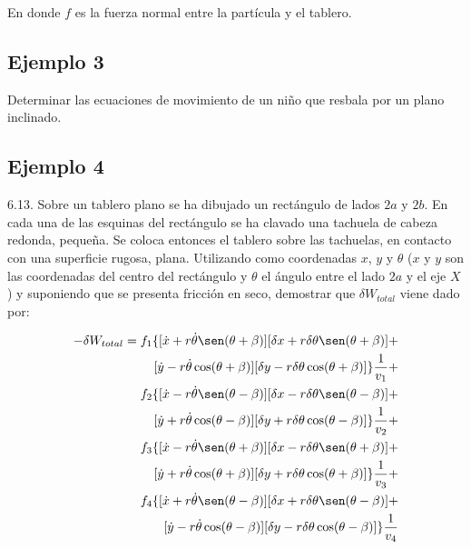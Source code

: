 En donde $f$ es la fuerza normal entre la partícula y el tablero.

\subsection{Ejemplo 3}
Determinar las ecuaciones de movimiento de un niño que resbala por un plano
inclinado.

\subsection{Ejemplo 4}
6.13. Sobre un tablero plano se ha dibujado un rectángulo de lados $2a$ y $2b$.
En cada una de las esquinas del rectángulo se ha clavado una tachuela de cabeza
redonda, pequeña. Se coloca entonces el tablero sobre las tachuelas, en contacto
con una superficie rugosa, plana. Utilizando como coordenadas $x$, $y$ y
$\theta$ ($x$ y $y$ son las coordenadas del centro del rectángulo y $\theta$ el
ángulo entre el lado $2a$ y el eje $X$) y suponiendo que se presenta fricción en
seco, demostrar que $\delta W_{total}$ viene dado por:

\begin{equation*}
\begin{split}
    -\delta W_{total}=f_1\{
        [\dot{x}+r\dot{\theta}\sen(\theta+\beta)]
        [\delta x+r\delta\theta\sen(\theta+\beta)]+\\
        [\dot{y}-r\dot{\theta}\cos(\theta+\beta)]
        [\delta y-r\delta\theta\cos(\theta+\beta)]
    \}\frac{1}{v_1}+\\
    f_2\{
        [\dot{x}-r\dot{\theta}\sen(\theta-\beta)]
        [\delta x-r\delta\theta\sen(\theta-\beta)]+\\
        [\dot{y}+r\dot{\theta}\cos(\theta-\beta)]
        [\delta y+r\delta\theta\cos(\theta-\beta)]
    \}\frac{1}{v_2}+\\
    f_3\{
        [\dot{x}-r\dot{\theta}\sen(\theta+\beta)]
        [\delta x-r\delta\theta\sen(\theta+\beta)]+\\
        [\dot{y}+r\dot{\theta}\cos(\theta+\beta)]
        [\delta y+r\delta\theta\cos(\theta+\beta)]
    \}\frac{1}{v_3}+\\
    f_4\{
        [\dot{x}+r\dot{\theta}\sen(\theta-\beta)]
        [\delta x+r\delta\theta\sen(\theta-\beta)]+\\
        [\dot{y}-r\dot{\theta}\cos(\theta-\beta)]
        [\delta y-r\delta\theta\cos(\theta-\beta)]
    \}\frac{1}{v_4}
\end{split}
\end{equation*}

